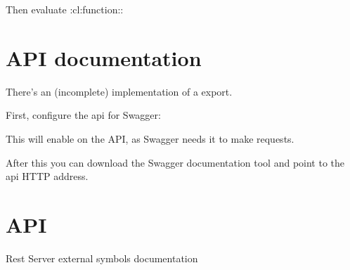 \documentclass[letterpaper,10pt,english]{sphinxmanual}
\begin{document}
Then evaluate :cl:function::

\begin{fulllineitems}
\label{\detokenize{api-configuration:function:rest-server:start-api-logging}}
\end{fulllineitems}



\chapter{API documentation}
\label{\detokenize{documentation:api-documentation}}\label{\detokenize{documentation::doc}}
There’s an (incomplete) implementation of a  export.

First, configure the api for Swagger:

\begin{sphinxVerbatim}[commandchars=\\\{\}]
 
\end{sphinxVerbatim}

This will enable  on the API, as Swagger needs it to make requests.

After this you can download the Swagger documentation tool and point to the api HTTP address.


\chapter{API}
\label{\detokenize{symbols:api}}\label{\detokenize{symbols::doc}}
Rest Server external symbols documentation

\begin{fulllineitems}
\label{\detokenize{symbols:function:rest-server:configure-api-resource}}
\end{fulllineitems}
\end{document}
